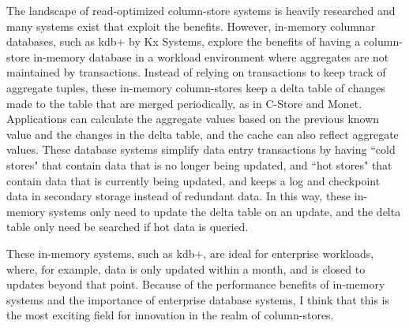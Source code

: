 The landscape of read-optimized column-store systems is heavily researched and many systems exist that exploit the benefits. However, in-memory columnar databases, such as kdb+ by Kx Systems, explore the benefits of having a column-store in-memory database in a workload environment where aggregates are not maintained by transactions\cite{kxsystems}. Instead of relying on transactions to keep track of aggregate tuples, these in-memory column-stores keep a delta table of changes made to the table that are merged periodically, as in C-Store and Monet. Applications can calculate the aggregate values based on the previous known value and the changes in the delta table, and the cache can also reflect aggregate values\cite{inmemory}. These database systems simplify data entry transactions by having ``cold stores" that contain data that is no longer being updated, and ``hot stores" that contain data that is currently being updated, and keeps a log and checkpoint data in secondary storage instead of redundant data\cite{inmemory}. In this way, these in-memory systems only need to update the delta table on an update, and the delta table only need be searched if hot data is queried.


These in-memory systems, such as kdb+, are ideal for enterprise workloads, where, for example, data is only updated within a month, and is closed to updates beyond that point. Because of the performance benefits of in-memory systems and the importance of enterprise database systems, I think that this is the most exciting field for innovation in the realm of column-stores.
